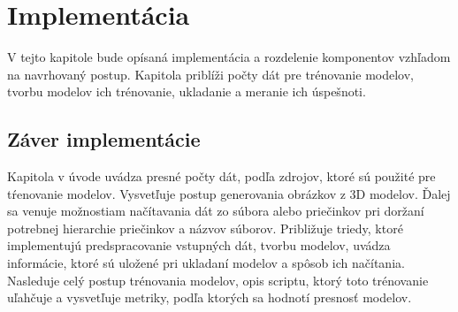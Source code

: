 
\chapter{Implementácia}

V tejto kapitole bude opísaná implementácia a rozdelenie komponentov vzhľadom na navrhovaný postup.
Kapitola priblíži počty dát pre trénovanie modelov, tvorbu modelov ich trénovanie, ukladanie a meranie ich úspešnoti.









\section{Záver implementácie}

Kapitola v úvode uvádza presné počty dát, podľa zdrojov, ktoré sú použité pre tŕenovanie modelov.
Vysvetľuje postup generovania obrázkov z 3D modelov.
Ďalej sa venuje možnostiam načítavania dát zo súbora alebo priečinkov pri doržaní potrebnej hierarchie priečinkov a názvov súborov.
Približuje triedy, ktoré implementujú predspracovanie vstupných dát, tvorbu modelov, uvádza informácie, ktoré sú uložené
    pri ukladaní modelov a spôsob ich načítania.
Nasleduje celý postup trénovania modelov, opis scriptu, ktorý toto trénovanie uľahčuje a vysvetľuje metriky, podľa ktorých sa hodnotí presnosť modelov.
